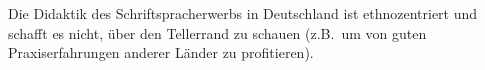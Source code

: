 Die Didaktik des Schriftspracherwerbs in Deutschland ist ethnozentriert und schafft es nicht, über den Tellerrand zu schauen (z.B.\ um von guten Praxiserfahrungen anderer Länder zu profitieren).